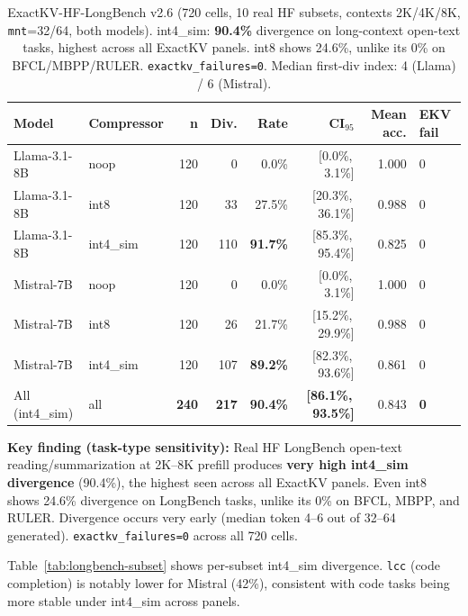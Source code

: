 \documentclass[11pt]{article}
\begin{document}
\begin{table}[htbp]
\centering\small\setlength\tabcolsep{5pt}
\renewcommand{\arraystretch}{1.05}
\begin{tabular}{llrrrrrl}
\toprule
\textbf{Model} & \textbf{Compressor} & \textbf{n} & \textbf{Div.} & \textbf{Rate} & \textbf{CI$_{95}$} & \textbf{Mean acc.} & \textbf{EKV fail} \\
\midrule
Llama-3.1-8B & noop      & 120 &   0 &  0.0\% & [0.0\%,\,3.1\%] & 1.000 & 0 \\
Llama-3.1-8B & int8      & 120 &  33 & 27.5\% & [20.3\%,\,36.1\%] & 0.988 & 0 \\
Llama-3.1-8B & int4\_sim  & 120 & 110 & \textbf{91.7\%} & [85.3\%,\,95.4\%] & 0.825 & 0 \\
\midrule
Mistral-7B   & noop      & 120 &   0 &  0.0\% & [0.0\%,\,3.1\%] & 1.000 & 0 \\
Mistral-7B   & int8      & 120 &  26 & 21.7\% & [15.2\%,\,29.9\%] & 0.988 & 0 \\
Mistral-7B   & int4\_sim  & 120 & 107 & \textbf{89.2\%} & [82.3\%,\,93.6\%] & 0.861 & 0 \\
\midrule
All (int4\_sim) & all & \textbf{240} & \textbf{217} & \textbf{90.4\%} & \textbf{[86.1\%,\,93.5\%]} & 0.843 & \textbf{0} \\
\bottomrule
\end{tabular}
\caption{ExactKV-HF-LongBench v2.6 (720 cells, 10 real HF subsets, contexts 2K/4K/8K,
\texttt{mnt}=32/64, both models). int4\_sim: \textbf{90.4\%} divergence on long-context
open-text tasks, highest across all ExactKV panels. int8 shows 24.6\%, unlike its 0\%
on BFCL/MBPP/RULER. \texttt{exactkv\_failures=0}. Median first-div index: 4 (Llama) / 6 (Mistral).}
\label{tab:hf-longbench-v26}
\end{table}

\textbf{Key finding (task-type sensitivity):}
Real HF LongBench open-text reading/summarization at 2K--8K prefill produces
\textbf{very high int4\_sim divergence} (90.4\%), the highest seen across all ExactKV panels.
Even int8 shows 24.6\% divergence on LongBench tasks, unlike its 0\% on BFCL, MBPP, and
RULER. Divergence occurs very early (median token 4--6 out of 32--64 generated).
\texttt{exactkv\_failures=0} across all 720 cells.

Table~\ref{tab:longbench-subset} shows per-subset int4\_sim divergence.
\texttt{lcc} (code completion) is notably lower for Mistral (42\%), consistent with
code tasks being more stable under int4\_sim across panels.
\end{document}
